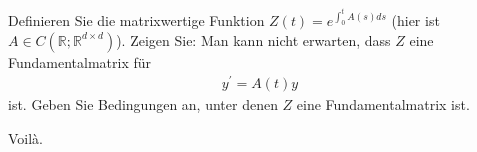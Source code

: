 \begin{exercise}
Definieren Sie die matrixwertige Funktion $Z(t) = e^{\int_0^tA(s)ds}$ (hier
ist $A \in C(\mathbb{R};\mathbb{R}^{d \times d})$). Zeigen Sie: Man kann nicht
erwarten, dass $Z$ eine Fundamentalmatrix für
\begin{align*}
  y^{\prime} = A(t)y
\end{align*}
ist. Geben Sie Bedingungen an, unter denen $Z$ eine Fundamentalmatrix ist.
\end{exercise}
\begin{solution}
Voilà.
\end{solution}
